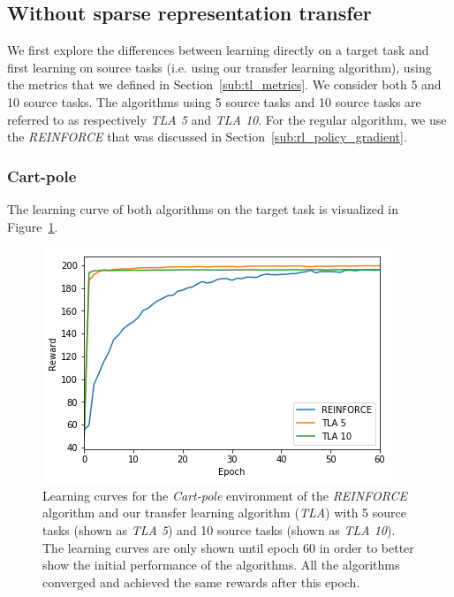 \subsection{Without sparse representation transfer} %
\label{sub:cartpole:without_sparse_representation_transfer}
We first explore the differences between learning directly on a target task and first learning on source tasks (i.e. using our transfer learning algorithm), using the metrics that we defined in Section~\ref{sub:tl_metrics}.
We consider both 5 and 10 source tasks.
The algorithms using 5 source tasks and 10 source tasks are referred to as respectively \textit{TLA 5} and \textit{TLA 10}.
For the regular algorithm, we use the \textit{REINFORCE} that was discussed in Section~\ref{sub:rl_policy_gradient}.

\subsubsection{Cart-pole} %
\label{ssub:without_sparse_representation_transfer:cartpole}
The learning curve of both algorithms on the target task is visualized in Figure~\ref{fig:CartPole:reward_target_re-akt5-akt10}.
\begin{figure}[htb]
    \centering
    \includegraphics[width=.8\linewidth]{images/results/CartPole/no_sparse_transfer/reward_target_re-akt5-akt10.png}
    \caption[Learning curves for \textit{REINFORCE} and \textit{TLA} for the \emph{Cart-pole} environment]{Learning curves for the \textit{Cart-pole} environment of the \textit{REINFORCE} algorithm and our transfer learning algorithm (\textit{TLA}) with 5 source tasks (shown as \textit{TLA 5}) and 10 source tasks (shown as \textit{TLA 10}). The learning curves are only shown until epoch 60 in order to better show the initial performance of the algorithms. All the algorithms converged and achieved the same rewards after this epoch.}
    \label{fig:CartPole:reward_target_re-akt5-akt10}
\end{figure}
